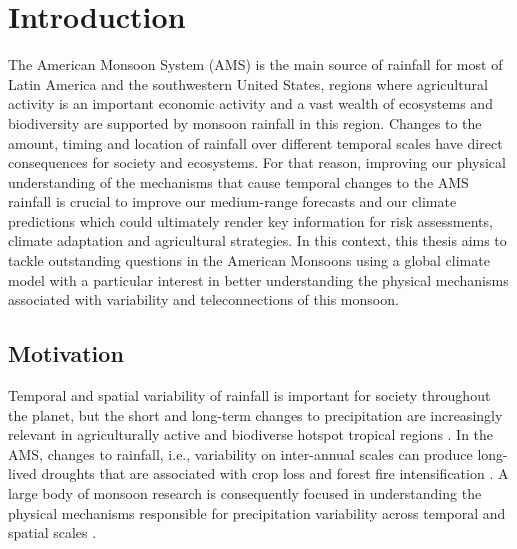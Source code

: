 

\chapter{\label{ch:1-intro}Introduction} 


The American Monsoon System (AMS) is the main source of rainfall for most of
Latin America and the southwestern United States, regions where agricultural
activity is an important economic activity and a vast wealth of ecosystems and biodiversity are
supported by monsoon rainfall in this region. Changes to the amount, timing and location of rainfall over different temporal scales
have direct consequences for society and ecosystems.%
For that reason, improving our physical understanding of the mechanisms that cause temporal changes to the
AMS rainfall is crucial to improve our medium-range forecasts and our climate predictions
which could ultimately render key information for risk assessments, climate adaptation and
agricultural strategies. In this context, this thesis aims to tackle outstanding questions in the
American Monsoons using a global climate model with a particular interest in better understanding
the physical mechanisms associated with variability and teleconnections of this monsoon.


\section{Motivation}

Temporal and spatial variability of rainfall is important for society throughout the planet, but the short and long-term changes to precipitation are increasingly relevant in agriculturally active and biodiverse hotspot tropical regions \citep{sultan2005,jain2015}. 
In the AMS, changes to rainfall, i.e., variability on inter-annual scales can produce long-lived droughts that are associated with crop loss and forest fire intensification \citep{chen2009,harvey2018}.
A large body of monsoon research is consequently focused in understanding the physical mechanisms responsible for precipitation variability across temporal and spatial scales \citep{wang2017,gadgil2018}. 

